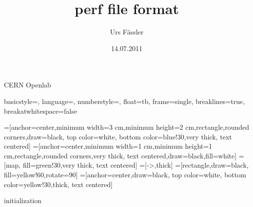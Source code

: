 
\usepackage[utf8]{inputenc}
\usepackage{amsmath}
\usepackage{amsfonts}
\usepackage{amssymb}
\usepackage{multicol}
\usepackage{graphicx}
\usepackage{tikz}
\usetikzlibrary{arrows,positioning,shapes}
\usepackage{listings}
\usepackage{multicol}
\usepackage{appendixnumberbeamer}
\usepackage{pstricks}
\usepackage{marvosym}
\usepackage{biblatex}

\newcommand{\code}[1]{\texttt{#1}}

\title{perf file format}
\author{Urs F\"assler}
\date{14.07.2011}
\institute
{
  CERN Openlab
}

\lstset
{  
  basicstyle=\small\ttfamily,
  language=,
  numberstyle={\color{Grey}},
  float=tb,
  frame=single,
  breaklines=true, %
  breakatwhitespace=false %
}

%


\beamertemplatenavigationsymbolsempty


\begin{frame}[plain]
  \titlepage
\end{frame}

\setcounter{framenumber}{0}

=[anchor=center,minimum width=3 cm,minimum height=2 cm,rectangle,rounded corners,draw=black, top color=white, bottom color=blue!30,very thick, text centered]
=[anchor=center,minimum width=1 cm,minimum height=1 cm,rectangle,rounded corners,very thick, text centered,draw=black,fill=white]
=[map, fill=green!30,very thick, text centered]
=[->,thick]
=[rectangle,draw=black, fill=yellow!60,rotate=90]
=[anchor=center,draw=black, top color=white, bottom color=yellow!30,thick, text centered]

\begin{frame}{initialization}
\begin{center}
\end{center}
\end{frame}

